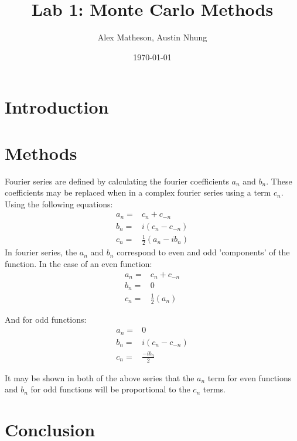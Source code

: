 \documentclass[twocolumn]{article}
\begin{document}
\title{Lab 1: Monte Carlo Methods}
\author{Alex Matheson, Austin Nhung}
\date{\today}
\maketitle

\section{Introduction}

\section{Methods}
Fourier series are defined by calculating the fourier coefficients $a_n$ and $b_n$. These coefficients may be replaced when in a complex fourier series using a term $c_n$. Using the following equations:
\begin{equation}
\begin{split}
a_n =& c_n + c_{-n} \\
b_n =& i(c_n - c_{-n}) \\
c_n =& \frac{1}{2}(a_n - ib_n)
\end{split}
\end{equation}
In fourier series, the $a_n$ and $b_n$ correspond to even and odd 'components' of the function. In the case of an even function:
\begin{equation}
\begin{split}
a_n =& c_n + c_{-n} \\
b_n =& 0 \\
c_n =& \frac{1}{2}(a_n)
\end{split}
\end{equation}

And for odd functions:
\begin{equation}
\begin{split}
a_n =& 0 \\
b_n =& i(c_n - c_{-n}) \\
c_n =& \frac{-ib_n}{2}
\end{split}
\end{equation} 
 
It may be shown in both of the above series that the $a_n$ term for even functions and $b_n$ for odd functions will be proportional to the $c_n$ terms. 
\section{Conclusion}
\end{document}
